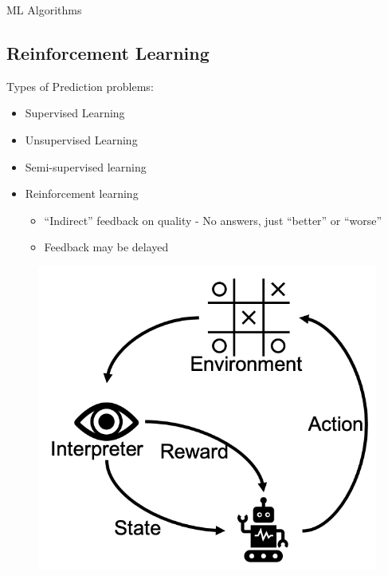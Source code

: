 \documentclass{beamer}
\begin{document}
\begin{frame}[allowframebreaks]{ML Algorithms}
\subsection{Reinforcement Learning}
Types of Prediction problems:
\begin{itemize}
\item Supervised Learning
\item Unsupervised Learning
\item Semi-supervised learning
\item Reinforcement learning
\begin{itemize}
    \item “Indirect” feedback on quality - No answers, just “better” or “worse”
    \item Feedback may be delayed
\end{itemize}
\end{itemize}
\begin{figure}
\centering
\captionsetup{justification=centering}
\includegraphics[scale=0.3]{RLDiag.png}
\end{figure}
\end{frame}
\end{document}
